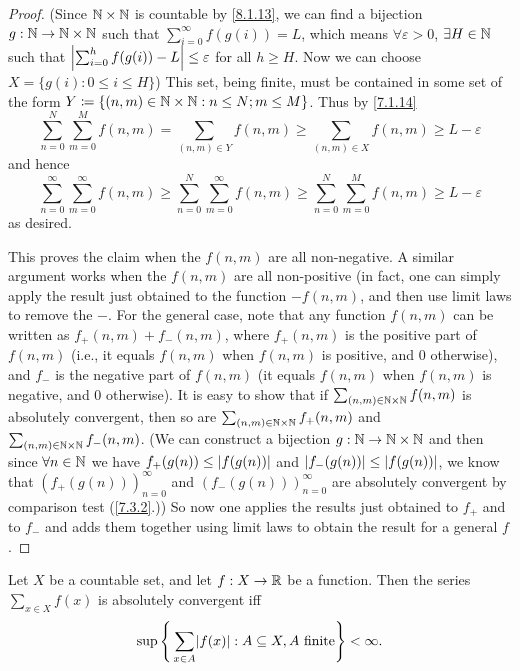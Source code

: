 \begin{proof}
  (Since \(\mathbb{N} \times \mathbb{N}\) is countable by \cref{8.1.13}, we can find a bijection \(g : \mathbb{N} \to \mathbb{N} \times \mathbb{N}\) such that \(\sum_{i = 0}^\infty f(g(i)) = L\), which means \(\forall \varepsilon > 0\), \(\exists H \in \mathbb{N}\) such that \(\left\lvert\sum_{i = 0}^h f(g(i)) - L\right\rvert \leq \varepsilon\) for all \(h \geq H\).
  Now we can choose \(X = \{g(i) : 0 \leq i \leq H\}\))
  This set, being finite, must be contained in some set of the form \(Y \coloneqq \{(n,m) \in \mathbb{N} \times \mathbb{N} : n \leq N; m \leq M \}\).
  Thus by \cref{7.1.14}
  \[
    \sum_{n = 0}^N \sum_{m = 0}^M f(n, m) = \sum_{(n, m) \in Y} f(n, m) \geq \sum_{(n, m) \in X} f(n, m) \geq L - \varepsilon
  \]
  and hence
  \[
    \sum_{n = 0}^\infty \sum_{m = 0}^\infty f(n, m) \geq \sum_{n = 0}^N \sum_{m = 0}^\infty f(n, m) \geq \sum_{n = 0}^N \sum_{m = 0}^M f(n, m) \geq L - \varepsilon
  \]
  as desired.

  This proves the claim when the \(f(n, m)\) are all non-negative.
  A similar argument works when the \(f(n, m)\) are all non-positive
  (in fact, one can simply apply the result just obtained to the function \(-f(n, m)\), and then use limit laws to remove the \(-\).
  For the general case, note that any function \(f(n, m)\) can be written as \(f_+(n, m) + f_-(n, m)\), where \(f_+(n, m)\) is the positive part of \(f(n, m)\)
  (i.e., it equals \(f(n, m)\) when \(f(n, m)\) is positive, and \(0\) otherwise),
  and \(f_-\) is the negative part of \(f(n, m)\)
  (it equals \(f(n, m)\) when \(f(n, m)\) is negative, and \(0\) otherwise).
  It is easy to show that if \(\sum_{(n, m) \in \mathbb{N} \times \mathbb{N}} f(n, m)\) is absolutely convergent, then so are \(\sum_{(n, m) \in \mathbb{N} \times \mathbb{N}} f_+(n, m)\) and \(\sum_{(n, m) \in \mathbb{N} \times \mathbb{N}} f_-(n, m)\).
  (We can construct a bijection \(g : \mathbb{N} \to \mathbb{N} \times \mathbb{N}\) and then since \(\forall n \in \mathbb{N}\) we have \(f_+(g(n)) \leq \left\lvert f(g(n))\right\rvert\) and \(\left\lvert f_-(g(n))\right\rvert \leq \left\lvert f(g(n))\right\rvert\), we know that \((f_+(g(n)))_{n = 0}^\infty\) and \((f_-(g(n)))_{n = 0}^\infty\) are absolutely convergent by comparison test (\cref{7.3.2}.))
  So now one applies the results just obtained to \(f_+\) and to \(f_-\) and adds them together using limit laws to obtain the result for a general \(f\).
\end{proof}

\begin{lem}\label{8.2.3}
  Let \(X\) be a countable set, and let \(f : X \to \mathbb{R}\) be a function.
  Then the series \(\sum_{x \in X} f(x)\) is absolutely convergent iff
  \[
    \sup\Bigg\{\sum_{x \in A} \abs{f(x)} : A \subseteq X, A \text{ finite}\Bigg\} < \infty.
  \]
\end{lem}

